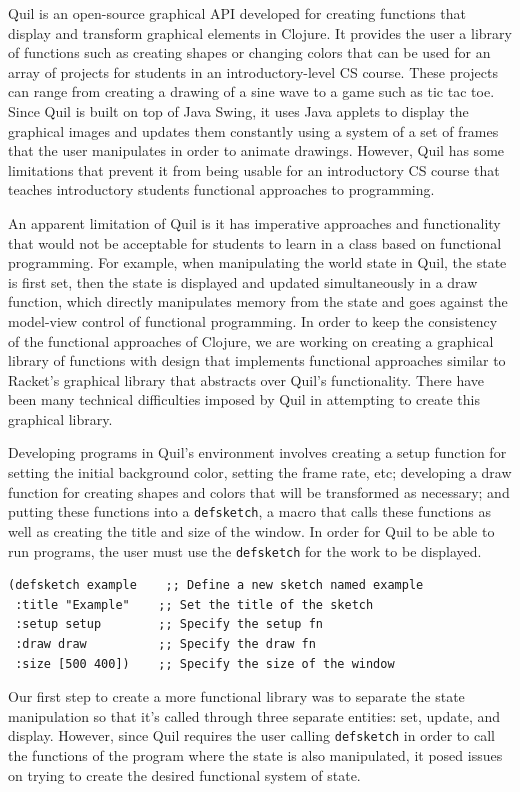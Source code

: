 \documentclass[12pt]{article}
\begin{document}
Quil is an open-source graphical API developed for creating functions that display and transform graphical elements in Clojure. It provides the user a library of functions such as creating shapes or changing colors that can be used for an array of projects for students in an introductory-level CS course. These projects can range from creating a drawing of a sine wave to a game such as tic tac toe. Since Quil is built on top of Java Swing, it uses Java applets to display the graphical images and updates them constantly using a system of a set of frames that the user manipulates in order to animate drawings. However, Quil has some limitations that prevent it from being usable for an introductory CS course that teaches introductory students functional approaches to programming.

An apparent limitation of Quil is it has imperative approaches and functionality that would not be acceptable for students to learn in a class based on functional programming. For example, when manipulating the world state in Quil, the state is first set, then the state is displayed and updated simultaneously in a draw function, which directly manipulates memory from the state and goes against the model-view control of functional programming. In order to keep the consistency of the functional approaches of Clojure, we are working on creating a graphical library of functions with design that implements functional approaches similar to Racket’s graphical library that abstracts over Quil's functionality. There have been many technical difficulties imposed by Quil in attempting to create this graphical library.

Developing programs in Quil's environment involves creating a setup function for setting the initial background color, setting the frame rate, etc; developing a draw function for creating shapes and colors that will be transformed as necessary; and putting these functions into a \texttt{defsketch}, a macro that calls these functions as well as creating the title and size of the window. In order for Quil to be able to run programs, the user must use the \texttt{defsketch} for the work to be displayed.
\begin{verbatim}
(defsketch example    ;; Define a new sketch named example
 :title "Example"    ;; Set the title of the sketch
 :setup setup        ;; Specify the setup fn
 :draw draw          ;; Specify the draw fn
 :size [500 400])    ;; Specify the size of the window
\end{verbatim}
Our first step to create a more functional library was to separate the state manipulation so that it’s called through three separate entities: set, update, and display. However, since Quil requires the user calling \texttt{defsketch} in order to call the functions of the program where the state is also manipulated, it posed issues on trying to create the desired functional system of state. 
\end{document}
